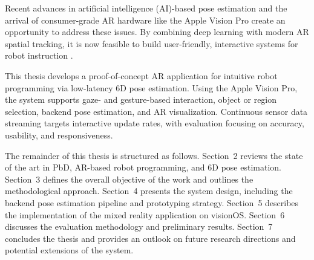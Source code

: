 Recent advances in artificial intelligence (AI)-based pose estimation and the arrival of consumer-grade AR hardware like the Apple Vision Pro create an opportunity to address these issues. By combining deep learning with modern AR spatial tracking, it is now feasible to build user-friendly, interactive systems for robot instruction \cite{lotsaris2021ar,wen2024foundationpose}.

This thesis develops a proof-of-concept AR application for intuitive robot programming via low-latency 6D pose estimation. Using the Apple Vision Pro, the system supports gaze- and gesture-based interaction, object or region selection, backend pose estimation, and AR visualization. Continuous sensor data streaming targets interactive update rates, with evaluation focusing on accuracy, usability, and responsiveness.

The remainder of this thesis is structured as follows. Section~2 reviews the state of the art in PbD, AR-based robot programming, and 6D pose estimation. Section~3 defines the overall objective of the work and outlines the methodological approach. Section~4 presents the system design, including the backend pose estimation pipeline and prototyping strategy. Section~5 describes the implementation of the mixed reality application on visionOS. Section~6 discusses the evaluation methodology and preliminary results. Section~7 concludes the thesis and provides an outlook on future research directions and potential extensions of the system.
